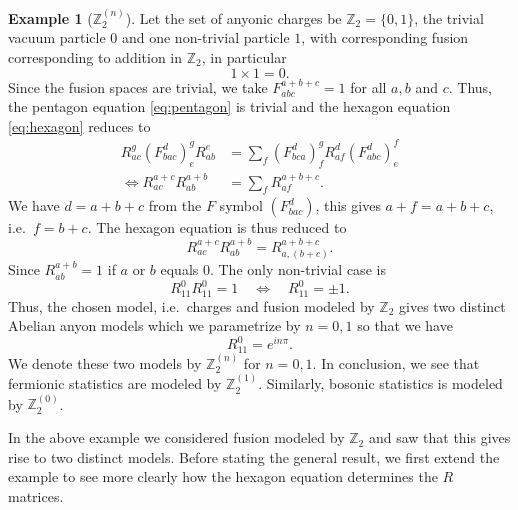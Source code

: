\documentclass[a4paper,10pt,oneside]{book}
\theoremstyle{plain}
\theoremstyle{definition}
\newtheorem{example}{Example}[section]
\theoremstyle{remark}
\begin{document}
\begin{example}[$\mathbb{Z}_2^{(n)}$]
  Let the set of anyonic charges be $\mathbb{Z}_2 = \{0, 1\}$, the trivial vacuum particle $0$ and one non-trivial particle $1$, with corresponding fusion corresponding to addition in $\mathbb{Z}_2$, in particular
  \begin{equation}
    1 × 1 = 0.
  \end{equation}
  Since the fusion spaces are trivial, we take $F_{abc}^{a+b+c} = 1$ for all $a, b$ and $c$. Thus, the pentagon equation \cref{eq:pentagon} is trivial and the hexagon equation \cref{eq:hexagon} reduces to
  \begin{equation}
    \begin{aligned}
      R_{ac}^g \left(F_{bac}^d\right)^g_e R_{ab}^e &= \sum_{f} \left(F_{bca}^d\right)^g_f R_{af}^d \left(F_{abc}^d\right)^f_e \\
      \iff
      R_{ac}^{a+c} R_{ab}^{a+b} &= \sum_{f} R_{af}^{a+b+c}.
    \end{aligned}
  \end{equation}
  We have $d = a + b + c$ from the $F$ symbol $\left(F_{bac}^d\right)$, this gives $a + f = a + b + c$, i.e.\ $f = b + c$. The hexagon equation is thus reduced to
  \begin{equation}
    R_{ac}^{a+c} R_{ab}^{a+b} = R_{a,(b+c)}^{a+b+c}.
  \end{equation}
  Since $R_{ab}^{a+b} = 1$ if $a$ or $b$ equals $0$. The only non-trivial case is
  \begin{equation}
    R_{11}^{0} R_{11}^{0} = 1 \quad \iff \quad R_{11}^{0} = ±1.
  \end{equation}
  Thus, the chosen model, i.e.\ charges and fusion modeled by $\mathbb{Z}_2$ gives two distinct Abelian anyon models which we parametrize by $n = 0, 1$ so that we have
  \begin{equation}
    R_{11}^0 = e^{inπ}.
  \end{equation}
  We denote these two models by $\mathbb{Z}_2^{(n)}$ for $n = 0, 1$. In conclusion, we see that fermionic statistics are modeled by $\mathbb{Z}_2^{(1)}$. Similarly, bosonic statistics is modeled by $\mathbb{Z}_2^{(0)}$.
\end{example}

In the above example we considered fusion modeled by $\mathbb{Z}_2$ and saw that this gives rise to two distinct models. Before stating the general result, we first extend the example to see more clearly how the hexagon equation determines the $R$ matrices.
\end{document}
